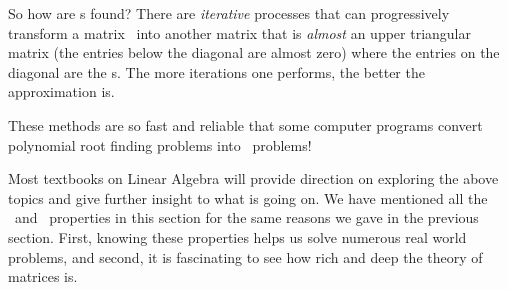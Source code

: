 So how are \el s found? There are \textit{iterative} processes that can progressively transform a matrix \tta\ into another matrix that is \textit{almost} an upper triangular matrix (the entries below the diagonal are almost zero) where the entries on the diagonal are the \el s. The more iterations one performs, the better the approximation is. 

These methods are so fast and reliable that some computer programs convert polynomial root finding problems into \el\ problems!

Most textbooks on Linear Algebra will provide direction on exploring the above topics and give further insight to what is going on. We have mentioned all the \el\ and \ev\ properties in this section for the same reasons we gave in the previous section. First, knowing these properties helps us solve numerous real world problems, and second, it is fascinating to see how rich and deep the theory of matrices is.

